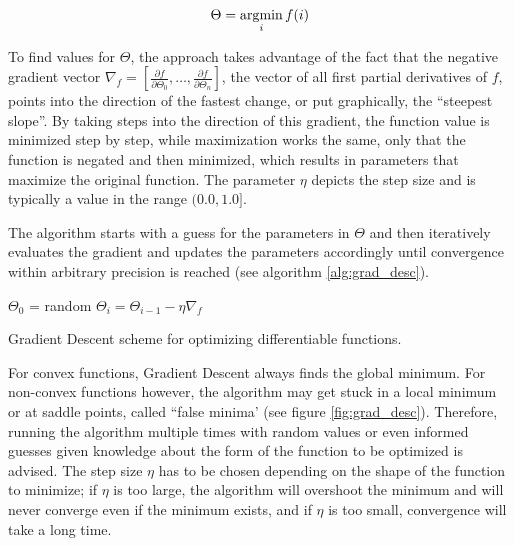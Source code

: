 \[ \Theta = \operatorname*{\arg\!\min} \limits_{i} f(i) \]

\noindent To find values for $\Theta$, the approach takes advantage of the fact that the negative gradient vector $\nabla_f = [ \frac{\partial f}{\partial \Theta_0}, \dots, \frac{\partial f}{\partial \Theta_n} ]$, the vector of all first partial derivatives of $f$, points into the direction of the fastest change, or put graphically, the ``steepest slope''. By taking steps into the direction of this gradient, the function value is minimized step by step, while maximization works the same, only that the function is negated and then minimized, which results in parameters that maximize the original function. The parameter $\eta$ depicts the step size and is typically a value in the range $(0.0, 1.0]$. \cite[pp. 40--42]{optimization_book}

The algorithm starts with a guess for the parameters in $\Theta$ and then iteratively evaluates the gradient and updates the parameters accordingly until convergence within arbitrary precision is reached (see algorithm \ref{alg:grad_desc}).

\begin {algorithm}
	\begin {algorithmic}[1]
		\State $\Theta_0$ = random
			\State $\Theta_i = \Theta_{i-1} - \eta \nabla_f$ 
		\EndWhile
	\end{algorithmic}
	\caption{Gradient Descent scheme for optimizing differentiable functions.}
	\label{alg:grad_desc}
\end{algorithm}

\noindent For convex functions, Gradient Descent always finds the global minimum. For non-convex functions however, the algorithm may get stuck in a local minimum or at saddle points, called ``false minima' (see figure \ref{fig:grad_desc}). Therefore, running the algorithm multiple times with random values or even informed guesses given knowledge about the form of the function to be optimized is advised. The step size $\eta$ has to be chosen depending on the shape of the function to minimize; if $\eta$ is too large, the algorithm will overshoot the minimum and will never converge even if the minimum exists, and if $\eta$ is too small, convergence will take a long time.

